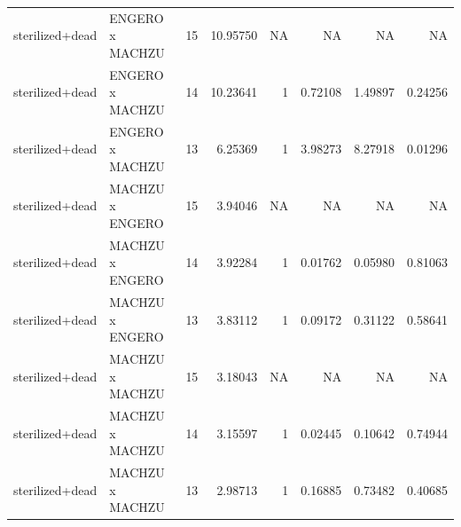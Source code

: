 \begin{table}[t]
\begin{tabular*}{\linewidth}{@{\extracolsep{\fill}}clrrrrrr}
sterilized+dead & ENGERO x MACHZU & 15 & 10.95750 & NA & NA & NA & NA \\ 
sterilized+dead & ENGERO x MACHZU & 14 & 10.23641 & 1 & 0.72108 & 1.49897 & 0.24256 \\ 
sterilized+dead & ENGERO x MACHZU & 13 & 6.25369 & 1 & 3.98273 & 8.27918 & 0.01296 \\ 
sterilized+dead & MACHZU x ENGERO & 15 & 3.94046 & NA & NA & NA & NA \\ 
sterilized+dead & MACHZU x ENGERO & 14 & 3.92284 & 1 & 0.01762 & 0.05980 & 0.81063 \\ 
sterilized+dead & MACHZU x ENGERO & 13 & 3.83112 & 1 & 0.09172 & 0.31122 & 0.58641 \\ 
sterilized+dead & MACHZU x MACHZU & 15 & 3.18043 & NA & NA & NA & NA \\ 
sterilized+dead & MACHZU x MACHZU & 14 & 3.15597 & 1 & 0.02445 & 0.10642 & 0.74944 \\ 
sterilized+dead & MACHZU x MACHZU & 13 & 2.98713 & 1 & 0.16885 & 0.73482 & 0.40685 \\ 
\bottomrule
\end{tabular*}
\end{table}

